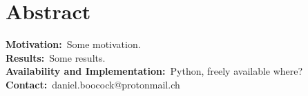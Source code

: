 \section*{Abstract}
\label{sec:abstract}

\textbf{Motivation:}~Some motivation.\\
\textbf{Results:}~Some results.\\
\textbf{Availability and Implementation:}~Python, freely available where?\\
\textbf{Contact:}~daniel.boocock@protonmail.ch\\


